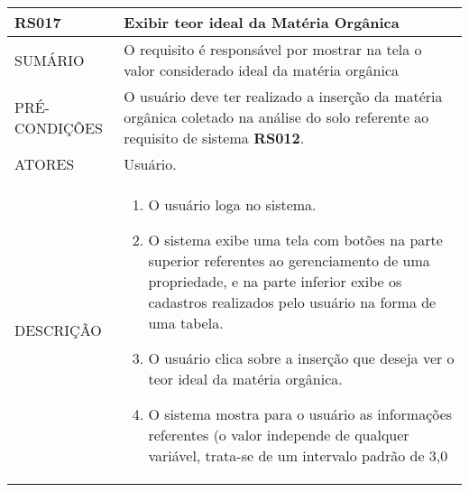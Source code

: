 \begin{longtable}[c]{@{}|p{4cm}|p{9cm}|@{}}
\hline
\begin{minipage}[t]{0.47\columnwidth}
\textbf{RS017}
\end{minipage} & \begin{minipage}[t]{0.47\columnwidth}
Exibir teor ideal da Matéria Orgânica
\end{minipage}
\\\hline
\begin{minipage}[t]{0.47\columnwidth}
SUMÁRIO
\end{minipage} & \begin{minipage}[t]{0.47\columnwidth}
O requisito é responsável por mostrar na tela o valor considerado ideal
da matéria orgânica
\end{minipage}
\\\hline
\begin{minipage}[t]{0.47\columnwidth}
PRÉ-CONDIÇÕES
\end{minipage} & \begin{minipage}[t]{0.47\columnwidth}
O usuário deve ter realizado a inserção da matéria orgânica coletado na
análise do solo referente ao requisito de sistema \textbf{RS012}.
\end{minipage}
\\\hline
\begin{minipage}[t]{0.47\columnwidth}
ATORES
\end{minipage} & \begin{minipage}[t]{0.47\columnwidth}
Usuário.
\end{minipage}
\\\hline
\begin{minipage}[t]{0.47\columnwidth}
DESCRIÇÃO
\end{minipage} & \begin{minipage}[t]{0.47\columnwidth}
\begin{enumerate}
\def\labelenumi{\arabic{enumi}.}
\itemsep1pt\parskip0pt\parsep0pt
\item
  O usuário loga no sistema.
\item
  O sistema exibe uma tela com botões na parte superior referentes ao
  gerenciamento de uma propriedade, e na parte inferior exibe os
  cadastros realizados pelo usuário na forma de uma tabela.
\item
  O usuário clica sobre a inserção que deseja ver o teor ideal da
  matéria orgânica.
\item
  O sistema mostra para o usuário as informações referentes (o valor
  independe de qualquer variável, trata-se de um intervalo padrão de 3,0

\end{enumerate}
\end{minipage}
\end{longtable}
